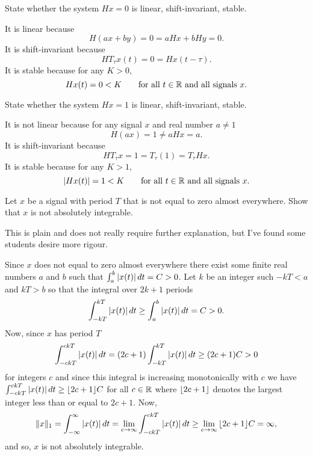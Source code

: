 \begin{excersizelist}
\item State whether the system $H x = 0$ is linear, shift-invariant,  stable.
\begin{solution}
It is linear because
\[
H(ax + by) = 0 = aH x + bH y = 0.
\]
It is shift-invariant because
\[
H T_{\tau} x (t) = 0 = H x(t-\tau).
\]
It is stable because for any $K > 0$,
\[
Hx(t) = 0 < K \qquad \text{for all $t \in {\mathbb R}$ and all signals $x$}. 
\]
\end{solution}

\item State whether the system $Hx = 1$ is linear, shift-invariant,  stable.
\begin{solution}
It is not linear because for any signal $x$ and real number $a \neq 1$
\[
H(ax) = 1 \neq  aHx = a.
\]
It is shift-invariant because
\[
HT_{\tau} x = 1 = T_\tau(1) = T_\tau Hx.
\]
It is  stable because for any $K > 1$, 
\[
\left\vert H x(t) \right\vert = 1 < K \qquad \text{for all $t \in {\mathbb R}$ and all signals $x$}. 
\]
\end{solution}

\item Let $x$ be a signal with period $T$ that is not equal to zero almost everywhere.  Show that $x$ is not absolutely integrable.
\begin{solution}
This is plain and does not really require further explanation, but I've found some students desire more rigour.  

Since $x$ does not equal to zero almost everywhere there exist some finite real numbers $a$ and $b$  such that $\int_{a}^b \left\vert x(t) \right\vert dt = C > 0$.  Let $k$ be an integer such $-kT < a$ and $kT > b$ so that the integral over $2k+1$ periods 
\[
\int_{-kT}^{kT}\left\vert x(t) \right\vert dt \geq \int_{a}^b \left\vert x(t) \right\vert dt = C > 0.
\] 
Now, since $x$ has period $T$
\[
\int_{-ckT}^{ckT}\left\vert x(t) \right\vert dt = (2c+1) \int_{-kT}^{kT}\left\vert x(t) \right\vert dt \geq (2c+1)C > 0
\] 
for integers $c$ and since this integral is increasing monotonically with $c$ we have $\int_{-ckT}^{ckT}\left\vert x(t) \right\vert dt \geq {\left\lfloor 2c+1 \right\rfloor}C$ for all $c \in {\mathbb R}$ where ${\left\lfloor 2c+1 \right\rfloor}$ denotes the largest integer less than or equal to $2c+1$.  Now,
\[
\|x\|_1 = \int_{-\infty}^{\infty} \left\vert x(t) \right\vert dt = \lim_{c \to \infty} \int_{-ckT}^{ckT}\left\vert x(t) \right\vert dt \geq \lim_{c \to \infty} {\left\lfloor 2c+1 \right\rfloor}C = \infty,
\]
and so, $x$ is not absolutely integrable.

\end{solution}

\end{excersizelist}

